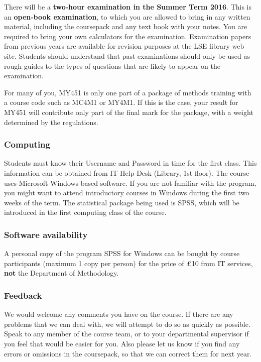 There will be a \textbf{two-hour examination in the Summer Term 2016}.
This is an \textbf{open-book examination}, to which you are allowed to
bring in any written material, including the coursepack and any text
book with your notes. You are required to bring your own calculators for
the examination. Examination papers from previous years are available
for revision purposes at the LSE library web site. Students should
understand that past examinations should only be used as rough guides to
the types of questions that are likely to appear on the examination.

For many of you, MY451 is only one part of a package of methods training
with a course code such as MC4M1 or MY4M1. If this is the case, your
result for MY451 will contribute only part of the final mark for the
package, with a weight determined by the regulations.


\subsubsection{Computing}


Students must know their Username and Password in time for the first
class.  This information can be obtained from IT Help Desk (Library, 1st
floor).  The course uses Microsoft Windows-based software.
If you are not familiar with the program, you might want to
attend introductory
courses in Windows during the first two weeks of the term.
The statistical package being used is SPSS, which will be
introduced in the first computing class of the course.


\subsubsection{Software availability}


A personal copy of the program SPSS for Windows can be bought by course
participants (maximum 1 copy per person) for the price of
\pounds10
from IT services, \textbf{not} the Department of Methodology.


\subsubsection{Feedback}


We would welcome any comments you have on the course.  If there are any
problems that we can deal with, we will attempt to do so as quickly as
possible.  Speak to any member of the course team, or to your
departmental supervisor if you feel that would be easier for you.
Also please let us know if you find any errors or omissions in the
coursepack, so that we can correct them for next year.

